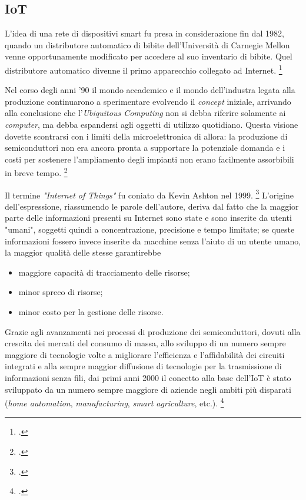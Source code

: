 \subsection{IoT}

L'idea di una rete di dispositivi smart fu presa in considerazione fin dal 1982, quando un distributore automatico di bibite dell'Università di Carnegie Mellon venne opportunamente modificato per accedere al suo inventario di bibite. Quel distributore automatico divenne il primo apparecchio collegato ad Internet.
\footcite{site:mellon-uni}

Nel corso degli anni '90 il mondo accademico e il mondo dell'industra legata alla produzione continuarono a sperimentare evolvendo il \textit{concept} iniziale, arrivando alla conclusione che l'\textit{Ubiquitous Computing} non si debba riferire solamente ai \textit{computer}, ma debba espandersi agli oggetti di utilizzo quotidiano. Questa visione dovette scontrarsi con i limiti della microelettronica di allora: la produzione di semiconduttori non era ancora pronta a supportare la potenziale domanda e i costi per sostenere l'ampliamento degli impianti non erano facilmente assorbibili in breve tempo. 
\footcite{site:mit-weiser}

Il termine \textit{"Internet of Things"} fu coniato da Kevin Ashton nel 1999.
\footcite{site:iot-kashton}
L'origine dell'espressione, riassumendo le parole dell'autore, deriva dal fatto che la maggior parte delle informazioni presenti su Internet sono state e sono inserite da utenti "umani", soggetti quindi a concentrazione, precisione e tempo limitate;
se queste informazioni fossero invece inserite da macchine senza l'aiuto di un utente umano, la maggior qualità delle stesse garantirebbe
\begin{itemize}
  \item maggiore capacità di tracciamento delle risorse;
  \item minor spreco di risorse;
  \item minor costo per la gestione delle risorse.
\end{itemize}

Grazie agli avanzamenti nei processi di produzione dei semiconduttori, dovuti alla crescita dei mercati del consumo di massa, allo sviluppo di un numero sempre maggiore di tecnologie volte a migliorare l'efficienza e l'affidabilità dei circuiti integrati e alla sempre maggior diffusione di tecnologie per la trasmissione di informazioni senza fili, dai primi anni 2000 il concetto alla base dell'IoT è stato sviluppato da un numero sempre maggiore di aziende negli ambiti più disparati (\textit{home automation}, \textit{manufacturing}, \textit{smart agriculture}, etc.). 
\footcite{site:pc-to-things}

